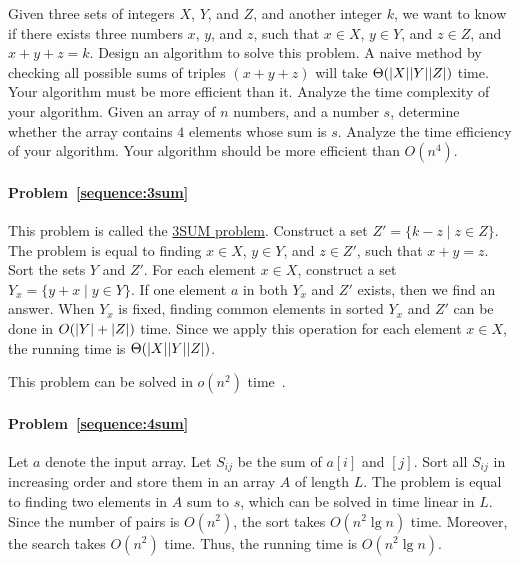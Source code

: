 \begin{Exercise}
\Question Given three sets of integers $X$, $Y$, and $Z$, and another integer $k$, we want to know if there exists three numbers $x$, $y$, and $z$, such that $x \in X$, $y \in Y$, and $z \in Z$, and $x + y + z = k$. Design an algorithm to solve this problem. A naive method by checking all possible sums of triples $(x+y+z)$ will take $\Theta(\lvert X\rvert\lvert Y\rvert\lvert Z\rvert)$ time. Your algorithm must be more efficient than it. Analyze the time complexity of your algorithm. \label{sequence:3sum} 
\Question Given an array of $n$ numbers, and a number $s$, determine whether the array contains $4$ elements whose sum is $s$. Analyze the time efficiency of your algorithm. Your algorithm should be more efficient than $O(n^4)$.  \label{sequence:4sum}  
\end{Exercise}
\begin{Answer}
\paragraph{Problem~\ref{sequence:3sum}} 
This problem is called the \href{https://en.wikipedia.org/wiki/3SUM}{3SUM problem}. Construct a set $Z' = \{k - z \mid z \in Z\}$. The problem is equal to finding $x \in X$, $y \in Y$, and $z \in Z'$, such that $x + y = z$. Sort the sets $Y$ and $Z'$. For each element $x \in X$, construct a set $Y_x = \{y + x \mid y \in Y\}$. If one element $a$ in both  $Y_x$ and $Z'$ exists, then we find an answer. When $Y_x$ is fixed, finding common elements in sorted $Y_x$ and $Z'$ can be done in $O(\lvert Y\rvert+\lvert Z\rvert)$ time. Since we apply this operation for each element $x \in X$, the running time is $\Theta(\lvert X\rvert\lvert Y\rvert\lvert Z\rvert)$.

\begin{remark}
This problem can be solved in $o(n^2)$ time~\cite{Jorgensen2014}.
\end{remark}

\paragraph{Problem~\ref{sequence:4sum}} Let $a$ denote the input array. Let $S_{ij}$ be the sum of $a[i]$ and $[j]$. Sort all $S_{ij}$ in increasing order and store them in an array $A$ of length $L$. The problem is equal to finding two elements in $A$ sum to $s$, which can be solved in time linear in $L$. Since the number of pairs is $O(n^2)$, the sort takes $O(n^2 \lg n)$ time. Moreover, the search takes $O(n^2)$ time. Thus, the running time is $O(n^2 \lg n)$.
\end{Answer}

